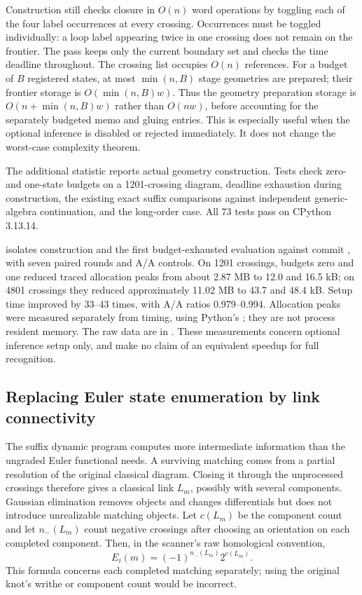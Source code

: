 Construction still checks closure in $O(n)$ word operations by toggling
each of the four label occurrences at every crossing. Occurrences must
be toggled individually: a loop label appearing twice in one crossing
does not remain on the frontier. The pass keeps only the current boundary
set and checks the time deadline throughout. The crossing list occupies
$O(n)$ references. For a budget of $B$ registered states, at most
$\min(n,B)$ stage geometries are prepared; their frontier storage is
$O(\min(n,B)w)$. Thus the geometry preparation storage is
$O(n+\min(n,B)w)$ rather than $O(nw)$, before accounting for the separately
budgeted memo and gluing entries. This is especially useful when the
optional inference is disabled or rejected immediately. It does not
change the worst-case complexity theorem.

The additional statistic  reports actual geometry
construction. Tests check zero- and one-state budgets on a 1201-crossing
diagram, deadline exhaustion during construction, the existing exact
suffix comparisons against independent generic-algebra continuation,
and the long-order case. All 73 tests pass on CPython 3.13.14.

 isolates construction and the
first budget-exhausted evaluation against commit , with
seven paired rounds and A/A controls. On 1201 crossings, budgets zero
and one reduced traced allocation peaks from about 2.87 MB to 12.0 and
16.5 kB; on 4801 crossings they reduced approximately 11.02 MB to 43.7
and 48.4 kB. Setup time improved by 33--43 times, with A/A ratios
0.979--0.994. Allocation peaks were measured separately from timing,
using Python's ; they are not process resident memory.
The raw data are in .
These measurements concern optional inference setup only, and make no
claim of an equivalent speedup for full recognition.

\subsection{Replacing Euler state enumeration by link connectivity}
The suffix dynamic program computes more intermediate information than
the ungraded Euler functional needs. A surviving matching comes from a
partial resolution of the original classical diagram. Closing it through
the unprocessed crossings therefore gives a classical link $L_m$, possibly
with several components. Gaussian elimination removes objects and changes
differentials but does not introduce unrealizable matching objects.
Let $c(L_m)$ be the component count and let $n_-(L_m)$ count negative
crossings after choosing an orientation on each completed component.
Then, in the scanner's raw homological convention,
\[
 E_i(m)=(-1)^{n_-(L_m)}2^{c(L_m)}.
\]
This formula concerns each completed matching separately; using the
original knot's writhe or component count would be incorrect.

